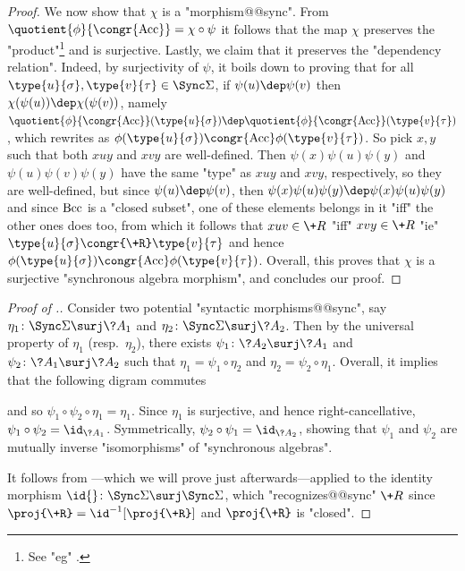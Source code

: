 \begin{proof}
	We now show that $\chi$ is a "morphism@@sync".
	From $\quotient{\phi}{\congr{\Acc}} = \chi \circ \psi$ it follows that
	the map $\chi$ preserves the "product"\footnote{See "eg" \cite[Lemma 3.2, p.~10]{Bojanczyk2015Recognisable}.} and is surjective.
	Lastly, we claim that it preserves the "dependency relation". Indeed,
	by surjectivity of $\psi$, it boils down to proving that
	for all $\type{u}{\sigma}, \type{v}{\tau} \in \Sync\Sigma$, if $\psi(u) \dep \psi(v)$ then
	$\chi(\psi(u)) \dep \chi(\psi(v))$, namely $\quotient{\phi}{\congr{\Acc}}(\type{u}{\sigma}) \dep
	\quotient{\phi}{\congr{\Acc}}(\type{v}{\tau})$, which
	rewrites as $\phi(\type{u}{\sigma}) \congr{\Acc} \phi(\type{v}{\tau})$.
	So pick $x, y$ such that both $xuy$ and $xvy$ are well-defined. Then
	$\psi(x)\psi(u)\psi(y)$ and $\psi(u)\psi(v)\psi(y)$ have the same "type"
	as $xuy$ and $xvy$, respectively, so they are well-defined,
	but since $\psi(u) \dep \psi(v)$, then $\psi(x)\psi(u)\psi(y) \dep \psi(x)\psi(u)\psi(y)$
	and since $\textrm{Bcc}$ is a "closed subset", one of these elements belongs in
	it "iff" the other ones does too, from which it follows
	that $xuv \in \+R$ "iff" $xvy \in \+R$ "ie" $\type{u}{\sigma} \congr{\+R} \type{v}{\tau}$
	and hence $\phi(\type{u}{\sigma}) \congr{\Acc} \phi(\type{v}{\tau})$.
	Overall, this proves that $\chi$ is a surjective "synchronous algebra morphism",
	and concludes our proof.
\end{proof}

\begin{proof}[Proof of .]
	 Consider two potential "syntactic morphisms@@sync",
	say $\eta_1\colon \Sync\Sigma \surj \?A_1$ and $\eta_2\colon \Sync\Sigma \surj \?A_2$.
	Then by the universal property of $\eta_1$ (resp.~$\eta_2$), there exists
	$\psi_1\colon \?A_2 \surj \?A_1$ and $\psi_2\colon \?A_1 \surj \?A_2$ such that
	$\eta_1 = \psi_1 \circ \eta_2$ and $\eta_2 = \psi_2 \circ \eta_1$. Overall, it implies that
	the following digram commutes
	\begin{center}
	\end{center}
	and so $\psi_1\circ \psi_2 \circ \eta_1 = \eta_1$. Since $\eta_1$
	is surjective, and hence right-cancellative, $\psi_1\circ \psi_2 = \id_{\?A_1}$.
	Symmetrically, $\psi_2 \circ \psi_1 = \id_{\?A_2}$, showing that
	$\psi_1$ and $\psi_2$ are mutually inverse "isomorphisms" of "synchronous algebras".

	 It follows from ---which we will prove
	just afterwards---applied to the identity morphism $\id{}\colon \Sync\Sigma \surj \Sync\Sigma$,
	which "recognizes@@sync" $\+R$ since $\proj{\+R} = \id^{-1}[\proj{\+R}]$ and $\proj{\+R}$
	is "closed".
\end{proof}

